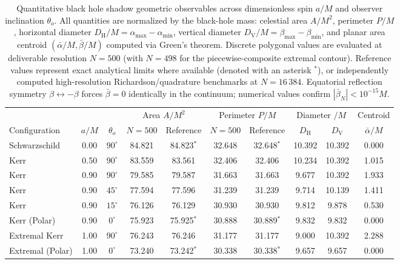 \begin{table}[t]
\centering
\small
\caption{Quantitative black hole shadow geometric observables across dimensionless spin $a/M$ and observer inclination $\theta_o$. All quantities are normalized by the black-hole mass: celestial area $A/M^2$, perimeter $P/M$, horizontal diameter $D_{\mathrm{H}}/M = \alpha_{\max} - \alpha_{\min}$, vertical diameter $D_{\mathrm{V}}/M = \beta_{\max} - \beta_{\min}$, and planar area centroid $(\bar{\alpha}/M, \bar{\beta}/M)$ computed via Green's theorem. Discrete polygonal values are evaluated at deliverable resolution $N=500$ (with $N=498$ for the piecewise-composite extremal contour). Reference values represent exact analytical limits where available (denoted with an asterisk $^*$), or independently computed high-resolution Richardson/quadrature benchmarks at $N=16\,384$. Equatorial reflection symmetry $\beta \leftrightarrow -\beta$ forces $\bar{\beta} = 0$ identically in the continuum; numerical values confirm $|\bar{\beta}_N| < 10^{-15}M$.}
\label{tab:shadow_observables}
\vspace{2mm}
\setlength{\tabcolsep}{4.5pt}
\begin{tabular}{lccccccccc}
\toprule
& & & \multicolumn{2}{c}{Area $A/M^2$} & \multicolumn{2}{c}{Perimeter $P/M$} & \multicolumn{2}{c}{Diameter $/M$} & Centroid \\
\cmidrule(lr){4-5} \cmidrule(lr){6-7} \cmidrule(lr){8-9}
Configuration & $a/M$ & $\theta_o$ & $N=500$ & Reference & $N=500$ & Reference & $D_{\mathrm{H}}$ & $D_{\mathrm{V}}$ & $\bar{\alpha}/M$ \\
\midrule
Schwarzschild & 0.00 & $90^\circ$ & 84.821 & 84.823$^*$ & 32.648 & 32.648$^*$ & 10.392 & 10.392 & 0.000 \\
Kerr & 0.50 & $90^\circ$ & 83.559 & 83.561 & 32.406 & 32.406 & 10.234 & 10.392 & 1.015 \\
Kerr & 0.90 & $90^\circ$ & 79.585 & 79.587 & 31.663 & 31.663 & 9.677 & 10.392 & 1.933 \\
Kerr & 0.90 & $45^\circ$ & 77.594 & 77.596 & 31.239 & 31.239 & 9.714 & 10.139 & 1.411 \\
Kerr & 0.90 & $15^\circ$ & 76.126 & 76.129 & 30.930 & 30.930 & 9.812 & 9.878 & 0.530 \\
Kerr (Polar) & 0.90 & $0^\circ$ & 75.923 & 75.925$^*$ & 30.888 & 30.889$^*$ & 9.832 & 9.832 & 0.000 \\
Extremal Kerr & 1.00 & $90^\circ$ & 76.243 & 76.246 & 31.177 & 31.177 & 9.000 & 10.392 & 2.288 \\
Extremal (Polar) & 1.00 & $0^\circ$ & 73.240 & 73.242$^*$ & 30.338 & 30.338$^*$ & 9.657 & 9.657 & 0.000 \\
\bottomrule
\end{tabular}
\end{table}

